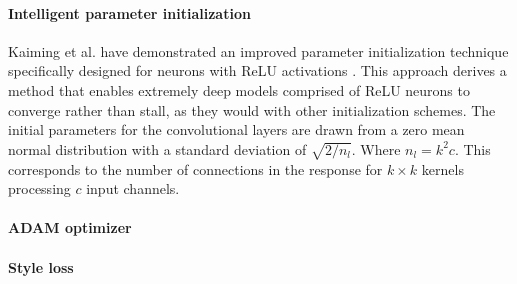 \paragraph{Intelligent parameter initialization}
Kaiming et al. have demonstrated an improved parameter initialization
technique specifically designed for neurons with ReLU activations
\cite{DBLP:journals/corr/HeZR015}. This approach derives a method that enables
extremely deep models comprised of ReLU neurons to converge rather than stall,
as they would with other initialization schemes. The initial parameters for
the convolutional layers are drawn from a zero mean normal distribution with a
standard deviation of  $\sqrt{2/n_l}$. Where $n_l = k^2c$. This corresponds to
the number of connections in the response for $k\times k$ kernels processing
$c$ input channels.

\paragraph{ADAM optimizer}
\paragraph{Style loss}
